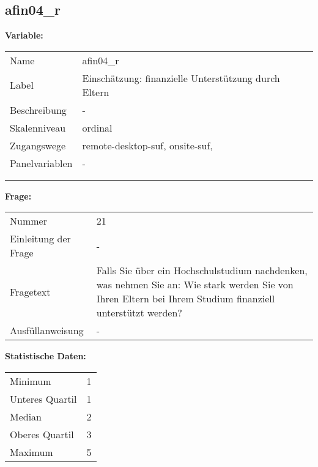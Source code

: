 	
	
	\subsection{afin04\_r}
	\label{subSection:afin04_r}

	\noindent\textbf{Variable:}\\
		\begin{tabular}{lL{11.3cm}}
			\label{tableVariable:afin04_r}
			Name & afin04\_r \\
			Label & Einschätzung: finanzielle Unterstützung durch Eltern \\
			Beschreibung & - \\
			Skalenniveau & ordinal \\
			Zugangswege &
				remote-desktop-suf,
				onsite-suf,
 \\
			Panelvariablen & -
			 \\
			 \\
 \\
		\end{tabular}

		\vspace*{1 cm}
		\noindent\textbf{Frage:}\\
		\begin{tabular}{lL{11.3cm}}
			\label{tableQuestion:afin04_r}
			Nummer & 21 \\
			Einleitung der Frage & - \\
			Fragetext & Falls Sie über ein Hochschulstudium nachdenken, was nehmen Sie an: Wie stark werden Sie von Ihren Eltern bei Ihrem Studium finanziell unterstützt werden? \\
			Ausfüllanweisung & - \\
		\end{tabular}


		\vspace*{1 cm}
		\noindent\textbf{Statistische Daten:}\\
			\begin{tabular}{ll}
				\label{tableStatistics:afin04_r}
					Minimum & 1 \\
					Unteres Quartil & 1 \\
					Median & 2 \\
					Oberes Quartil & 3 \\
					Maximum & 5 \\
			\end{tabular}



